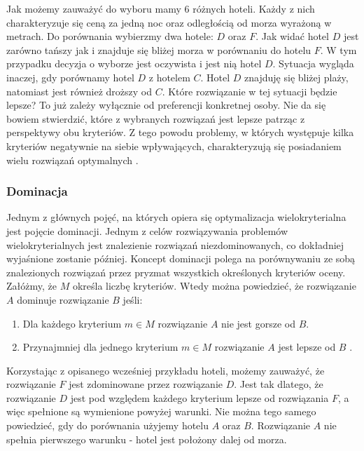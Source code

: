 \documentclass[twoside]{iisthesis}
\begin{document}
Jak możemy zauważyć do wyboru mamy 6 różnych hoteli. Każdy z nich charakteryzuje się ceną za jedną noc oraz odległością od morza wyrażoną w metrach. Do porównania wybierzmy dwa hotele: $D$ oraz $F$. Jak widać hotel $D$ jest zarówno tańszy jak i znajduje się bliżej morza w porównaniu do hotelu $F$. W tym przypadku decyzja o wyborze jest oczywista i jest nią hotel $D$. Sytuacja wygląda inaczej, gdy porównamy hotel $D$ z hotelem $C$. Hotel $D$ znajduję się bliżej plaży, natomiast jest również droższy od $C$. Które rozwiązanie w tej sytuacji będzie lepsze? To już zależy wyłącznie od preferencji konkretnej osoby. Nie da się bowiem stwierdzić, które z wybranych rozwiązań jest lepsze patrząc z perspektywy obu kryteriów. Z tego powodu problemy, w których występuje kilka kryteriów negatywnie na siebie wpływających, charakteryzują się posiadaniem wielu rozwiązań optymalnych \cite{book_ergot}.

\subsubsection{Dominacja}
Jednym z głównych pojęć, na których opiera się optymalizacja wielokryterialna jest pojęcie dominacji. Jednym z celów rozwiązywania problemów wielokryterialnych jest znalezienie rozwiązań niezdominowanych, co dokładniej wyjaśnione zostanie później. Koncept dominacji polega na porównywaniu ze sobą znalezionych rozwiązań przez pryzmat wszystkich określonych kryteriów oceny. Załóżmy, że $M$ określa liczbę kryteriów. Wtedy można powiedzieć, że rozwiązanie $A$ dominuje rozwiązanie $B$ jeśli:\\
\begin{enumerate}
	\item Dla każdego kryterium $m \in M$ rozwiązanie $A$ nie jest gorsze od $B$.
	\item Przynajmniej dla jednego kryterium $m \in M$ rozwiązanie $A$ jest lepsze od $B$ \cite{book}.\\
\end{enumerate}
Korzystając z opisanego wcześniej przykładu hoteli, możemy zauważyć, że rozwiązanie $F$ jest zdominowane przez rozwiązanie $D$. Jest tak dlatego, że rozwiązanie $D$ jest pod względem każdego kryterium lepsze od rozwiązania $F$, a więc spełnione są wymienione powyżej warunki. Nie można tego samego powiedzieć, gdy do porównania użyjemy hotelu $A$ oraz $B$. Rozwiązanie $A$ nie spełnia pierwszego warunku - hotel jest położony dalej od morza.
\end{document}
